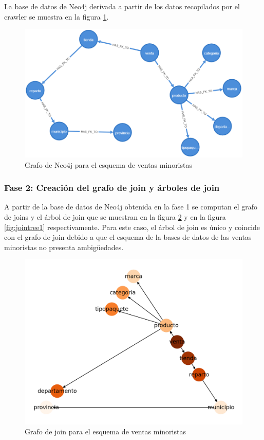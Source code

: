La base de datos de Neo4j derivada a 
partir de los datos recopilados por el crawler se muestra en la figura \ref{fig:catalogexp1}.

\begin{figure}[H]
  \centering
  \includegraphics[scale=0.4]{Graphics/graph (1).png}
  \caption{Grafo de Neo4j para el esquema de ventas minoristas}
  \label{fig:catalogexp1}
\end{figure}

\subsubsection{Fase 2: Creaci\'on del grafo de join y \'arboles de join}

A partir de la base de datos de Neo4j obtenida en la fase 1 se computan el grafo de joins y el \'arbol de 
join que se muestran en la figura \ref{fig:graphjoin1} y en la figura \ref{fig:jointree1} respectivamente. Para este caso, 
el \'arbol de join es \'unico y coincide  con el grafo de join debido a que el esquema de la bases de datos de 
las ventas minoristas no presenta ambigüedades.

\begin{figure}[H]
  \centering
  \includegraphics[scale=0.6]{Graphics/joingraph1.png}
  \caption{Grafo de join para el esquema de ventas minoristas}
  \label{fig:graphjoin1}
\end{figure}

